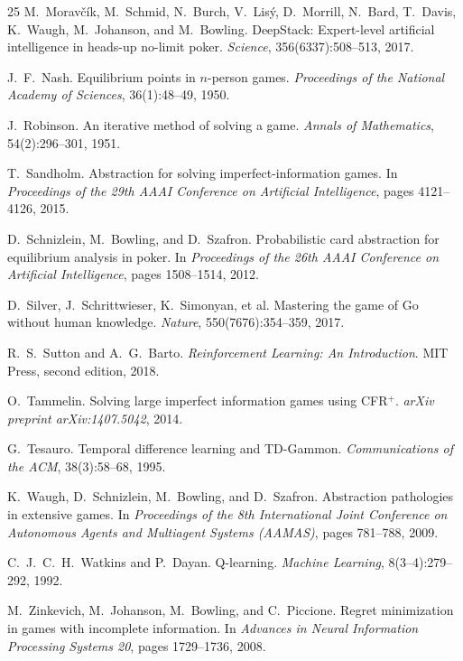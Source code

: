 \begin{thebibliography}{25}
M.~Morav\v{c}\'ik, M.~Schmid, N.~Burch, V.~Lis\'y, D.~Morrill, N.~Bard, T.~Davis, K.~Waugh, M.~Johanson, and M.~Bowling.
\newblock DeepStack: Expert-level artificial intelligence in heads-up no-limit poker.
\newblock \emph{Science}, 356(6337):508--513, 2017.

J.~F.~Nash.
\newblock Equilibrium points in $n$-person games.
\newblock \emph{Proceedings of the National Academy of Sciences}, 36(1):48--49, 1950.

J.~Robinson.
\newblock An iterative method of solving a game.
\newblock \emph{Annals of Mathematics}, 54(2):296--301, 1951.

T.~Sandholm.
\newblock Abstraction for solving imperfect-information games.
\newblock In \emph{Proceedings of the 29th AAAI Conference on Artificial Intelligence}, pages 4121--4126, 2015.

D.~Schnizlein, M.~Bowling, and D.~Szafron.
\newblock Probabilistic card abstraction for equilibrium analysis in poker.
\newblock In \emph{Proceedings of the 26th AAAI Conference on Artificial Intelligence}, pages 1508--1514, 2012.

D.~Silver, J.~Schrittwieser, K.~Simonyan, et al.
\newblock Mastering the game of Go without human knowledge.
\newblock \emph{Nature}, 550(7676):354--359, 2017.

R.~S.~Sutton and A.~G.~Barto.
\newblock \emph{Reinforcement Learning: An Introduction}.
\newblock MIT Press, second edition, 2018.

O.~Tammelin.
\newblock Solving large imperfect information games using CFR$^{+}$.
\newblock \emph{arXiv preprint arXiv:1407.5042}, 2014.

G.~Tesauro.
\newblock Temporal difference learning and TD-Gammon.
\newblock \emph{Communications of the ACM}, 38(3):58--68, 1995.

K.~Waugh, D.~Schnizlein, M.~Bowling, and D.~Szafron.
\newblock Abstraction pathologies in extensive games.
\newblock In \emph{Proceedings of the 8th International Joint Conference on Autonomous Agents and Multiagent Systems (AAMAS)}, pages 781--788, 2009.

C.~J.~C.~H.~Watkins and P.~Dayan.
\newblock Q-learning.
\newblock \emph{Machine Learning}, 8(3--4):279--292, 1992.

M.~Zinkevich, M.~Johanson, M.~Bowling, and C.~Piccione.
\newblock Regret minimization in games with incomplete information.
\newblock In \emph{Advances in Neural Information Processing Systems 20}, pages 1729--1736, 2008.

\end{thebibliography}
